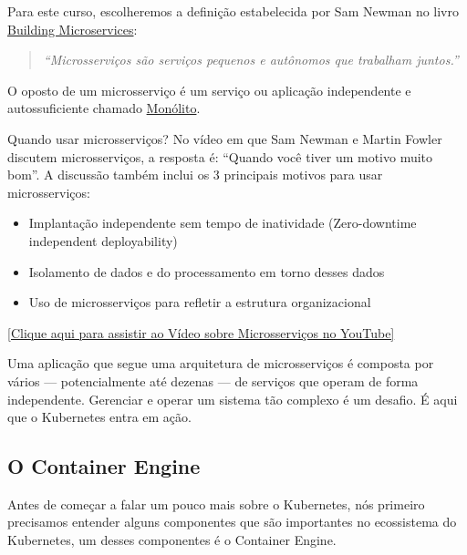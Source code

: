 \documentclass[12pt,a4paper]{article}
\begin{document}
Para este curso, escolheremos a definição estabelecida por Sam Newman no livro \href{https://www.oreilly.com/library/view/building-microservices/9781491950340/}{Building Microservices}:

\begin{quote}
\textit{``Microsserviços são serviços pequenos e autônomos que trabalham juntos.''}
\end{quote}

O oposto de um microsserviço é um serviço ou aplicação independente e autossuficiente chamado \href{https://en.wikipedia.org/wiki/Monolithic_application}{Monólito}.

Quando usar microsserviços? No vídeo em que Sam Newman e Martin Fowler discutem microsserviços, a resposta é: ``Quando você tiver um motivo muito bom''.
A discussão também inclui os 3 principais motivos para usar microsserviços:

\begin{itemize}
    \item Implantação independente sem tempo de inatividade (Zero-downtime independent deployability)
    \item Isolamento de dados e do processamento em torno desses dados
    \item Uso de microsserviços para refletir a estrutura organizacional
\end{itemize}

\vspace{1em}

\begin{center}
  \href{https://www.youtube.com/watch?v=GBTdnfD6s5Q}{[Clique aqui para assistir ao Vídeo sobre Microsserviços no YouTube]}
\end{center}

\vspace{1em}

Uma aplicação que segue uma arquitetura de microsserviços é composta por vários — potencialmente até dezenas — de serviços que operam de forma independente. Gerenciar e operar um sistema tão complexo é um desafio. É aqui que o Kubernetes entra em ação.

\vspace{1em}

\subsection{O Container Engine}
\label{sec:engine}

Antes de começar a falar um pouco mais sobre o Kubernetes, nós primeiro precisamos entender alguns componentes que são importantes no ecossistema do Kubernetes, um desses componentes é o Container Engine. 
\end{document}
